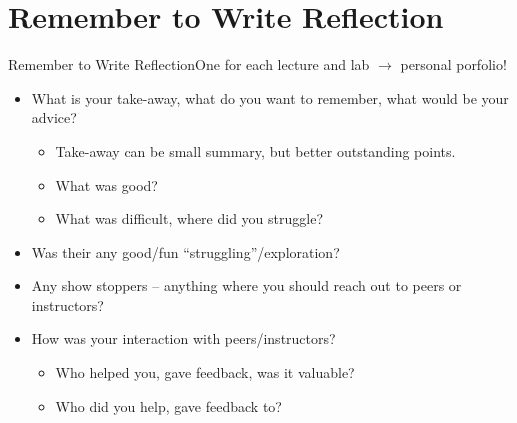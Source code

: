﻿\section{Remember to Write Reflection}

\begin{frame}{Remember to Write Reflection}{One for each lecture and lab $\rightarrow$ personal porfolio!}
\begin{itemize}
    \item What is your \alert{take-away}, what do you want to \alert{remember}, what would be your advice?
\begin{itemize}
    \item Take-away can be \alert{small summary}, but better outstanding points.
    \item What was good?
    \item What was difficult, where did you struggle?
\end{itemize}
\item Was their any good/fun “struggling”/exploration?
\item Any show stoppers – anything where you should reach out to peers or instructors?
\item How was your interaction with peers/instructors?
\begin{itemize}
    \item Who helped you, gave feedback, was it valuable?
    \item Who did you help, gave feedback to?
\end{itemize}
\end{itemize}
\end{frame}
